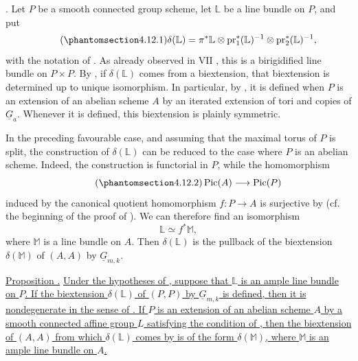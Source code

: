 
\medskip
\noindent {}.  Let $P$ be a smooth connected group scheme, let
$\mathbb L$ be a line bundle on $P$, and put
\begin{equation}\tag{\SGARefTarget{sga7.sga7i.eviii.n4-12-1}{4.12.1}}
 \delta(\mathbb L)=
 \pi^*\mathbb L\otimes
 \pr_1^*(\mathbb L)^{-1}\otimes
 \pr_2^*(\mathbb L)^{-1},
\end{equation}
with the notation of .  As already observed in VII , this is
a birigidified line bundle on $P\times P$.  By , if
$\delta(\mathbb L)$ comes from a biextension, that biextension is
determined up to unique isomorphism.  In particular, by , it is
defined when $P$ is an extension of an abelian scheme $A$ by an
iterated extension of tori and copies of $\underline G_a$.  Whenever
it is defined, this biextension is plainly symmetric.

In the preceding favourable case, and assuming that the maximal
torus of $P$ is split, the construction of $\delta(\mathbb L)$ can
be reduced to the case where $P$ is an abelian scheme.  Indeed, the
construction is functorial in $P$, while the homomorphism
\begin{equation}\tag{\SGARefTarget{sga7.sga7i.eviii.n4-12-2}{4.12.2}}
 \Pic(A)\longrightarrow\Pic(P)
\end{equation}
induced by the canonical quotient homomorphism
$f:P\longrightarrow A$ is surjective by  (cf. the beginning of
the proof of ).  We can therefore find an isomorphism
\[
 \mathbb L\simeq f^*\mathbb M,
\]
where $\mathbb M$ is a line bundle on $A$.  Then
$\delta(\mathbb L)$ is the pullback of the biextension
$\delta(\mathbb M)$ of $(A,A)$ by $\underline G_{m,k}$.

\medskip
\noindent\underline{Proposition .}  \underline{Under the
hypotheses of , suppose that $\mathbb L$ is an ample line bundle
on $P$.  If the biextension $\delta(\mathbb L)$ of $(P,P)$ by
$\underline G_{m,k}$ is defined, then it is nondegenerate in the
sense of .  If $P$ is an extension of an abelian scheme $A$ by a
smooth connected affine group $L$ satisfying the condition of ,
then the biextension of $(A,A)$ from which $\delta(\mathbb L)$ comes
by  is of the form $\delta(\mathbb M)$, where $\mathbb M$ is an
ample line bundle on $A$.}

